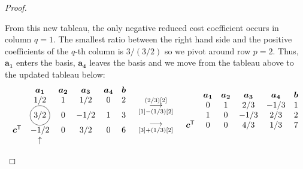 \documentclass[12pt]{article}
\newcommand*\circled[1]{\tikz[baseline=(char.base)]{
            \node[shape=circle,draw,inner sep=2pt] (char) {#1};}}
\theoremstyle{definition}
\newcommand{\vc}[1]{\boldsymbol{#1}}
\newcommand{\grstep}[2][\relax]{%
   \ensuremath{\mathrel{
       {\mathop{\longrightarrow}\limits^{#2\mathstrut}_{
                                     \begin{subarray}{l} #1 \end{subarray}}}}}}
\newcommand{\tran}{\mathsf{T}}
\begin{document}
\begin{proof}
\begin{enumerate}
      From this new tableau, the only negative reduced cost coefficient occurs in
      column $q=1$. The smallest ratio between the right hand side and the positive
      coefficients of the $q$-th column is $3 / (3/2)$ so we pivot around
      row $p=2$. Thus, $\vc{a_1}$ enters the basis,
      $\vc{a_4}$ leaves the basis and we move from the tableau above to the updated tableau below:
      \begin{align*}
        \begin{matrix}
          & \vc{a_1} & \vc{a_2} & \vc{a_3} & \vc{a_4} & \vc{b} \\
          & 1/2 & 1 & 1/2 & 0 & 2 \\
          & \circled{3/2} & 0 & -1/2 & 1 & 3 \\
          \vc{c}^\tran & -1/2 & 0  & 3/2 & 0 & 6 \\
          & \uparrow &  & & & \\
        \end{matrix}
        \quad
        \begin{array}{c}
          \grstep[{[1] - (1/3)[2]}]{(2/3)[2]} \\
          \grstep[{[3] + (1/3)[2]}]{} \\
        \end{array}
        \quad
        \begin{matrix}
          & \vc{a_1} & \vc{a_2} & \vc{a_3} & \vc{a_4} & \vc{b} \\
          & 0 & 1 & 2/3 & -1/3 & 1 \\
          & 1 & 0 & -1/3 & 2/3 & 2 \\
          \vc{c}^\tran & 0 & 0  & 4/3 & 1/3 & 7 \\
          & &  & & & \\
        \end{matrix}
      \end{align*}


\end{enumerate}
\end{proof}
\end{document}
